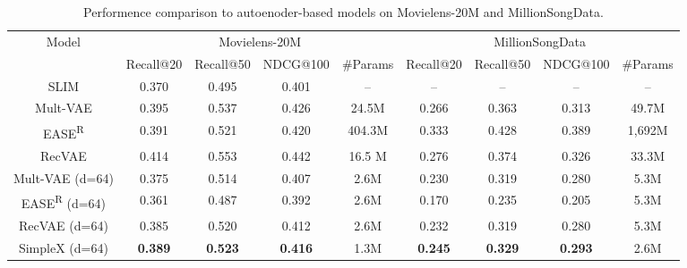 \documentclass[sigconf,authorversion]{acmart}
\begin{document}
\begin{table*}[htbp]
\centering
\renewcommand\arraystretch{1.1}
\setlength{\tabcolsep}{0.55ex}
\setlength{\belowcaptionskip}{-1ex}
\caption{Performence comparison to autoenoder-based models on Movielens-20M and MillionSongData.}
\begin{tabular}{c|cccc|cccc}
\hline
\multirow{2}{*}{Model} & \multicolumn{4}{c|}{Movielens-20M}   & \multicolumn{4}{c}{MillionSongData}                                                                                                      \\ \cline{2-9}
& \multicolumn{1}{l}{Recall@20} & \multicolumn{1}{l}{Recall@50} & \multicolumn{1}{l|}{NDCG@100} & \#Params 
& \multicolumn{1}{l}{Recall@20} & \multicolumn{1}{l}{Recall@50} & \multicolumn{1}{l|}{NDCG@100} & \#Params
\\ \hline
\multicolumn{1}{c|}{SLIM}                            & 0.370                         & 0.495                         & \multicolumn{1}{c|}{0.401}    & --   
      & --                         & --                         & \multicolumn{1}{c|}{--}     & --   
\\
\multicolumn{1}{c|}{Mult-VAE}                        & 0.395                         & 0.537                         & \multicolumn{1}{c|}{0.426}    & 24.5M 
      & 0.266                         & 0.363                        & \multicolumn{1}{c|}{0.313}    & 49.7M  
\\
\multicolumn{1}{c|}{EASE\textsuperscript{R}}         & 0.391                         & 0.521                         & \multicolumn{1}{c|}{0.420}    & 404.3M   
      & 0.333                        & 0.428                      & \multicolumn{1}{c|}{0.389}    & 1,692M   
\\
\multicolumn{1}{c|}{RecVAE}         & 0.414                         & 0.553                         & \multicolumn{1}{c|}{0.442}    & 16.5 M   
      & 0.276                        & 0.374                         & \multicolumn{1}{c|}{0.326}    & 33.3M   
\\ \hline
\multicolumn{1}{c|}{Mult-VAE (d=64)}                 & 0.375                         & 0.514                        & \multicolumn{1}{c|}{0.407}    & 2.6M  
      & 0.230                        & 0.319                       & \multicolumn{1}{c|}{0.280}    & 5.3M  
\\
\multicolumn{1}{c|}{EASE\textsuperscript{R} (d=64)}  & 0.361                         & 0.487                         & \multicolumn{1}{c|}{0.392}    & 2.6M   
 & 0.170                         & 0.235                         & \multicolumn{1}{c|}{0.205}    & 5.3M  
\\
\multicolumn{1}{c|}{RecVAE (d=64)}  & 0.385                         & 0.520                         & \multicolumn{1}{c|}{0.412}    & 2.6M   
 & 0.232                         & 0.319                         & \multicolumn{1}{c|}{0.280}    & 5.3M  
\\\hline
\multicolumn{1}{c|}{SimpleX (d=64)}                  & \textbf{0.389}                        & \textbf{0.523}                         & \multicolumn{1}{c|}{\textbf{0.416}}    & 1.3M 
  & \textbf{0.245}    & \textbf{0.329}                         & \multicolumn{1}{c|}{\textbf{0.293}}    & 2.6M 
    

\end{tabular}
\end{table*}
\end{document}
